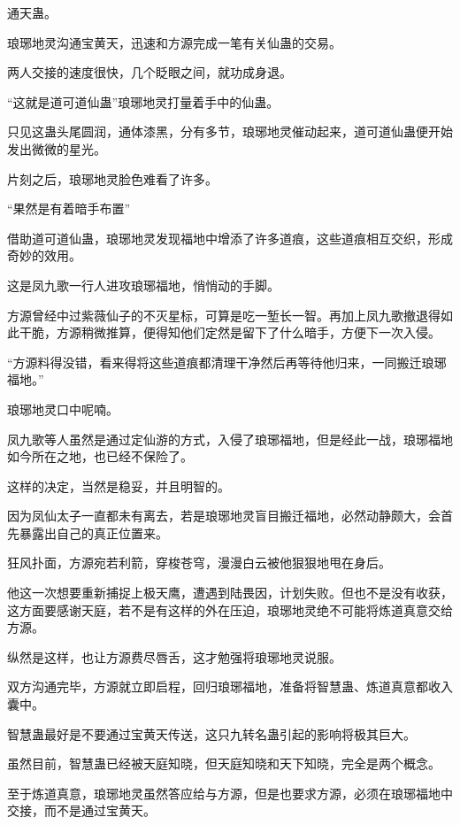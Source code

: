 
\begin{this_body}



通天蛊。

琅琊地灵沟通宝黄天，迅速和方源完成一笔有关仙蛊的交易。

两人交接的速度很快，几个眨眼之间，就功成身退。

“这就是道可道仙蛊”琅琊地灵打量着手中的仙蛊。

只见这蛊头尾圆润，通体漆黑，分有多节，琅琊地灵催动起来，道可道仙蛊便开始发出微微的星光。

片刻之后，琅琊地灵脸色难看了许多。

“果然是有着暗手布置”

借助道可道仙蛊，琅琊地灵发现福地中增添了许多道痕，这些道痕相互交织，形成奇妙的效用。

这是凤九歌一行人进攻琅琊福地，悄悄动的手脚。

方源曾经中过紫薇仙子的不灭星标，可算是吃一堑长一智。再加上凤九歌撤退得如此干脆，方源稍微推算，便得知他们定然是留下了什么暗手，方便下一次入侵。

“方源料得没错，看来得将这些道痕都清理干净然后再等待他归来，一同搬迁琅琊福地。”

琅琊地灵口中呢喃。

凤九歌等人虽然是通过定仙游的方式，入侵了琅琊福地，但是经此一战，琅琊福地如今所在之地，也已经不保险了。

这样的决定，当然是稳妥，并且明智的。

因为凤仙太子一直都未有离去，若是琅琊地灵盲目搬迁福地，必然动静颇大，会首先暴露出自己的真正位置来。

狂风扑面，方源宛若利箭，穿梭苍穹，漫漫白云被他狠狠地甩在身后。

他这一次想要重新捕捉上极天鹰，遭遇到陆畏因，计划失败。但也不是没有收获，这方面要感谢天庭，若不是有这样的外在压迫，琅琊地灵绝不可能将炼道真意交给方源。

纵然是这样，也让方源费尽唇舌，这才勉强将琅琊地灵说服。

双方沟通完毕，方源就立即启程，回归琅琊福地，准备将智慧蛊、炼道真意都收入囊中。

智慧蛊最好是不要通过宝黄天传送，这只九转名蛊引起的影响将极其巨大。

虽然目前，智慧蛊已经被天庭知晓，但天庭知晓和天下知晓，完全是两个概念。

至于炼道真意，琅琊地灵虽然答应给与方源，但是也要求方源，必须在琅琊福地中交接，而不是通过宝黄天。


\end{this_body}
